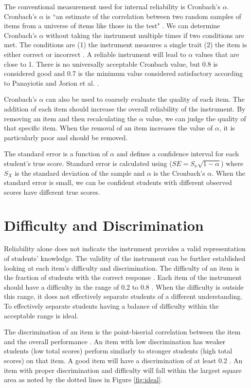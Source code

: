 The conventional measurement used for internal reliability is Cronbach's $\alpha$.  Cronbach's $\alpha$ is ``an estimate of the correlation between two random samples of items from a universe of items like those in the test" \cite{og_cronbach}. We can determine Cronbach's $\alpha$  without taking the instrument multiple times if two conditions are met. The conditions are (1) the instrument measures a single trait (2) the item is either correct or incorrect \cite{dlci}. A reliable instrument will lead to $\alpha$ values that are close to 1.  There is no universally acceptable Cronbach value, but 0.8 is considered good and 0.7 is the minimum value considered satisfactory according to Panayiotis \cite{panayiotis} and Jorion et al. \cite{jorian}.

Cronbach's $\alpha$ can also be used to coarsely evaluate the quality of each item. The addition of each item should increase the overall reliability of the instrument\cite{dlci}. By removing an item and then recalculating the $\alpha$ value, we can judge the quality of that specific item. When the removal of an item increases the value of $\alpha$, it is particularly poor and should be removed.


The standard error is a function of $\alpha$ and defines a confidence interval for each student's true score. Standard error is calculated using ($SE = S_x \sqrt{1-\alpha}$) where $S_X$ is the standard deviation of the sample and $\alpha$ is the Cronbach's $\alpha$. When the standard error is small, we can be confident students with different observed scores have different true scores. 


\section{Difficulty and Discrimination}

Reliability alone does not indicate the instrument provides a valid representation of students' knowledge. The validity of the instrument can be further established looking at each item's difficulty and discrimination. The difficulty of an item is the fraction of students with the correct response \cite{og_ctt}.  Each item of the instrument should have a difficulty in the range of 0.2 to 0.8 \cite{dlci, jorian}. When the difficulty is outside this range, it does not effectively separate students of a different understanding. To effectively separate students having a balance of difficulty within the acceptable range is ideal.

The discrimination of an item is the point-biserial correlation between the item and the overall performance \cite{jorian}. An item with low discrimination has weaker students (low total scores) perform similarly to stronger students (high total scores) on that item. A good item will have a discrimination of at least 0.2 \cite{dlci}. \iflong An item with proper discrimination and difficulty will fall within the largest square area as noted by the dotted lines in Figure \ref{fig:ideal}.\fi 

